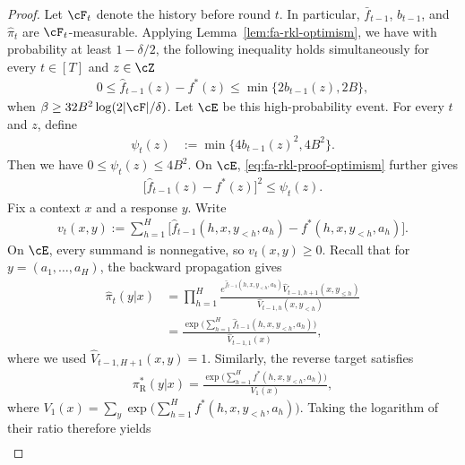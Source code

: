 \documentclass[11pt]{article}
\newcommand{\pir}{\pi_{\mathrm{R}}}
\begin{document}
\begin{proof}
Let $\cF_t$ denote the history before round $t$.
In particular, $\bar f_{t-1}$, $b_{t-1}$, and
$\hat\pi_t$ are $\cF_t$-measurable.
Applying Lemma~\ref{lem:fa-rkl-optimism}, we have with probability at least $1-\delta/2$, the following inequality holds  simultaneously for every $t\in[T]$ and $z\in\cZ$
\begin{align}
    0
    \leq
    \hat f_{t-1}(z)-f^*(z)
    \leq
    \min\{2b_{t-1}(z),2B\},
    \label{eq:fa-rkl-proof-optimism}
\end{align}
when $\beta \ge
    32B^2\log({2|\cF|}/{\delta})$. Let $\cE$ be this high-probability event. For every $t$ and $z$, define
\begin{align}
    \psi_t(z)
    &:=
    \min\{4b_{t-1}(z)^2,4B^2\}.
    \label{eq:fa-rkl-proof-error-proxy}
\end{align}
Then we have $0\leq\psi_t(z)\leq4B^2$. On $\cE$, \eqref{eq:fa-rkl-proof-optimism} further gives
\begin{align}
    \big[
        \hat f_{t-1}(z)-f^*(z)
    \big]^2
    \leq
    \psi_t(z).
    \label{eq:fa-rkl-proof-error-domination}
\end{align}
Fix a context $x$ and a response $y$. Write
\begin{align*}
    v_t(x,y)
    :=
    \sum_{h=1}^H
    \Big[
        \hat f_{t-1}(h,x,y_{<h},a_h)
        -
        f^*(h,x,y_{<h},a_h)
    \Big].
\end{align*}
On $\cE$, every summand is nonnegative, so
$v_t(x,y)\geq0$. Recall that for $y=(a_1,\ldots,a_H)$, the backward propagation gives
\begin{align*}
    \hat\pi_t(y|x)
    &=
    \prod_{h=1}^H
    \frac{
        e^{\hat f_{t-1}(h,x,y_{<h},a_h)}
        \hat V_{t-1,h+1}(x,y_{\leq h})
    }{
        \hat V_{t-1,h}(x,y_{<h})
    }\\
    &=
    \frac{
        \exp\big(
            \sum_{h=1}^H
            \hat f_{t-1}(h,x,y_{<h},a_h)
        \big)
    }{
        \hat V_{t-1,1}(x)
    },
\end{align*}
where we used $\hat V_{t-1,H+1}(x,y)=1$.
Similarly, the reverse target satisfies
\begin{align*}
    \pir^*(y|x)
    =
    \frac{
        \exp\big(
            \sum_{h=1}^H
            f^*(h,x,y_{<h},a_h)
        \big)
    }{
        V_1(x)
    },
\end{align*}
where $V_1(x) = \sum_y \exp\big(\sum_{h=1}^H f^*(h,x,y_{<h},a_h)\big)$. Taking the logarithm of their ratio therefore yields
\begin{align}

\end{align}
\end{proof}
\end{document}
